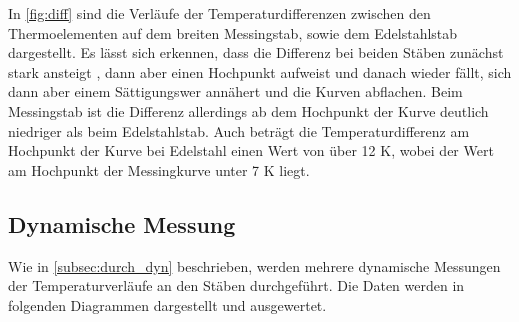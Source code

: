In \autoref{fig:diff} sind die Verläufe der Temperaturdifferenzen zwischen den Thermoelementen auf dem breiten Messingstab, sowie dem Edelstahlstab dargestellt.
Es lässt sich erkennen, dass die Differenz bei beiden Stäben zunächst stark ansteigt , dann aber einen Hochpunkt aufweist und danach wieder fällt,
sich dann aber einem Sättigungswer annähert und die Kurven abflachen. 
Beim Messingstab ist die Differenz allerdings ab dem Hochpunkt der Kurve deutlich niedriger als beim Edelstahlstab.
Auch beträgt die Temperaturdifferenz am Hochpunkt der Kurve bei Edelstahl einen Wert von über 12 K, wobei der Wert am Hochpunkt der Messingkurve unter 7 K liegt.

\subsection{Dynamische Messung}
\label{aus_dyn}

Wie in \autoref{subsec:durch_dyn} beschrieben, werden mehrere dynamische Messungen der Temperaturverläufe an den Stäben durchgeführt. 
Die Daten werden in folgenden Diagrammen dargestellt und ausgewertet.

